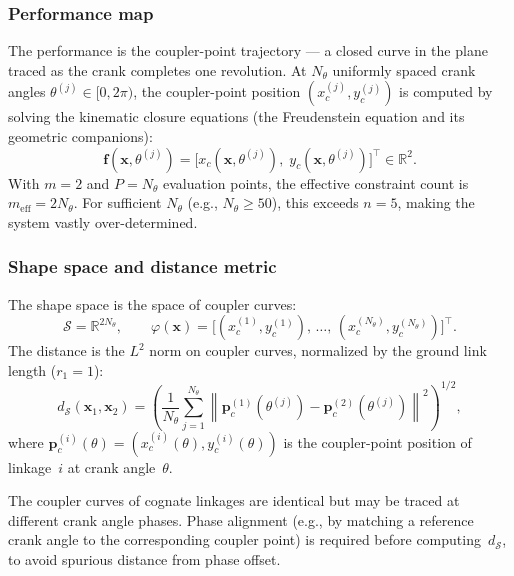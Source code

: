 \subsubsection{Performance map}

The performance is the coupler-point trajectory --- a closed curve in the plane traced as the crank completes one revolution. At $N_\theta$ uniformly spaced crank angles $\theta^{(j)} \in [0, 2\pi)$, the coupler-point position $(x_c^{(j)}, y_c^{(j)})$ is computed by solving the kinematic closure equations (the Freudenstein equation and its geometric companions):
\begin{equation}
    \mathbf{f}(\mathbf{x}, \theta^{(j)}) = \bigl[x_c(\mathbf{x}, \theta^{(j)}),\; y_c(\mathbf{x}, \theta^{(j)})\bigr]^\top \in \mathbb{R}^2.
    \label{eq:fourbar_perf}
\end{equation}
With $m = 2$ and $P = N_\theta$ evaluation points, the effective constraint count is $m_{\mathrm{eff}} = 2 N_\theta$. For sufficient $N_\theta$ (e.g., $N_\theta \geq 50$), this exceeds $n = 5$, making the system vastly over-determined.


\subsubsection{Shape space and distance metric}

The shape space is the space of coupler curves:
\begin{equation}
    \mathcal{S} = \mathbb{R}^{2N_\theta}, \qquad
    \varphi(\mathbf{x}) = \bigl[(x_c^{(1)}, y_c^{(1)}),\, \ldots,\, (x_c^{(N_\theta)}, y_c^{(N_\theta)})\bigr]^\top.
\end{equation}
The distance is the $L^2$ norm on coupler curves, normalized by the ground link length ($r_1 = 1$):
\begin{equation}
    d_{\mathcal{S}}(\mathbf{x}_1, \mathbf{x}_2)
    = \left( \frac{1}{N_\theta} \sum_{j=1}^{N_\theta}
    \left\| \mathbf{p}_c^{(1)}(\theta^{(j)}) - \mathbf{p}_c^{(2)}(\theta^{(j)}) \right\|^2 \right)^{1/2},
    \label{eq:fourbar_distance}
\end{equation}
where $\mathbf{p}_c^{(i)}(\theta) = (x_c^{(i)}(\theta), y_c^{(i)}(\theta))$ is the coupler-point position of linkage~$i$ at crank angle~$\theta$.

\begin{remark}
The coupler curves of cognate linkages are identical but may be traced at different crank angle phases. Phase alignment (e.g., by matching a reference crank angle to the corresponding coupler point) is required before computing~$d_{\mathcal{S}}$, to avoid spurious distance from phase offset.
\end{remark}


